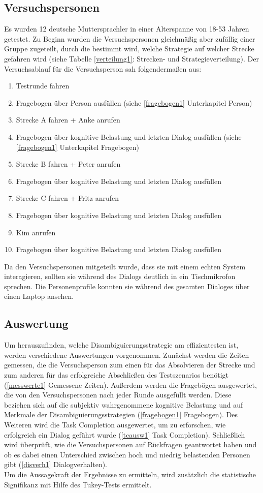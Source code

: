 \documentclass[12pt,a4paper]{scrartcl}
\begin{document}
\subsection{Versuchspersonen}
Es wurden 12 deutsche Muttersprachler in einer Alterspanne von 18-53 Jahren getestet. Zu Beginn wurden die Versuchspersonen gleichmäßig aber zufällig einer Gruppe zugeteilt, durch die bestimmt wird, welche Strategie auf welcher Strecke gefahren wird (siehe Tabelle \ref{verteilung1}: Strecken- und Strategieverteilung).
Der Versuchsablauf für die Versuchsperson sah folgendermaßen aus:
\begin{enumerate}
\item Testrunde fahren
\item Fragebogen über Person ausfüllen (siehe \ref{fragebogen1} Unterkapitel Person)
\item Strecke A fahren + Anke anrufen
\item Fragebogen über kognitive Belastung und letzten Dialog ausfüllen (siehe \ref{fragebogen1} Unterkapitel Fragebogen)
\item Strecke B fahren + Peter anrufen
\item Fragebogen über kognitive Belastung und letzten Dialog ausfüllen
\item Strecke C fahren + Fritz anrufen
\item Fragebogen über kognitive Belastung und letzten Dialog ausfüllen 
\item Kim anrufen
\item Fragebogen über kognitive Belastung und letzten Dialog ausfüllen 
\end{enumerate}

Da den Versuchspersonen mitgeteilt wurde, dass sie mit einem echten System interagieren, sollten sie während des Dialogs deutlich in ein Tischmikrofon sprechen. Die Personenprofile konnten sie während des gesamten Dialoges über einen Laptop ansehen.

\subsection{Auswertung}
\label{auswertung1}
Um herauszufinden, welche Disambiguierungsstrategie am effizientesten ist, werden verschiedene Auswertungen vorgenommen. 
Zunächst werden die Zeiten gemessen, die die Versuchsperson zum einen für das Absolvieren der Strecke und zum anderen für das erfolgreiche Abschließen des Testszenarios benötigt (\ref{messwerte1} Gemessene Zeiten).
Außerdem werden die Fragebögen ausgewertet, die von den Versuchspersonen nach jeder Runde ausgefüllt werden. Diese beziehen sich auf die subjektiv wahrgenommene kognitive Belastung und auf Merkmale der Disambiguierungsstrategien (\ref{fragebogen1} Fragebogen). Des Weiteren wird die Task Completion ausgewertet, um zu erforschen, wie erfolgreich ein Dialog geführt wurde (\ref{tcausw1} Task Completion). Schließlich wird überprüft, wie die Versuchspersonen auf Rückfragen geantwortet haben und ob es dabei einen Unterschied zwischen hoch und niedrig belastenden Personen gibt (\ref{disverh1} Dialogverhalten). \\
Um die Aussagekraft der Ergebnisse zu ermitteln, wird zusätzlich die statistische Signifikanz mit Hilfe des Tukey-Tests ermittelt. 
\end{document}
